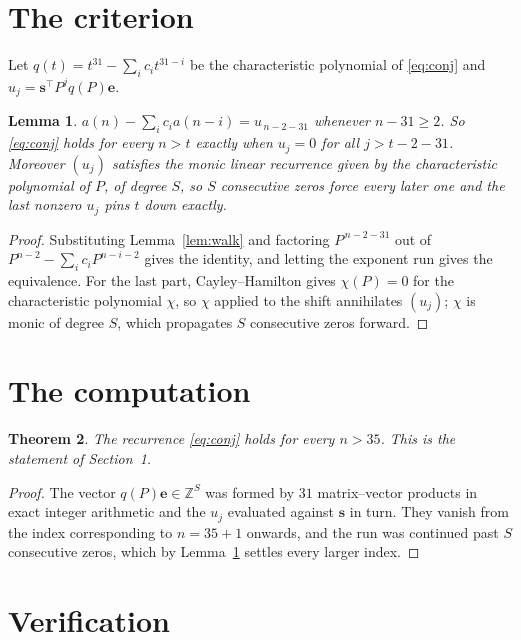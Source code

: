\documentclass[11pt,a4paper]{article}
\theoremstyle{plain}
\newtheorem{theorem}{Theorem}
\newtheorem{lemma}[theorem]{Lemma}
\theoremstyle{definition}
\begin{document}
\section{The criterion}

Let $q(t)=t^{31}-\sum_i c_i t^{31-i}$ be the characteristic polynomial of
\eqref{eq:conj} and $u_j=\mathbf{s}^{\!\top}P^{j}q(P)\mathbf{e}$.

\begin{lemma}\label{lem:crit}
$a(n)-\sum_i c_i a(n-i)=u_{\,n-2-31}$ whenever $n-31\ge2$. So \eqref{eq:conj}
holds for every $n>t$ exactly when $u_j=0$ for all $j>t-2-31$. Moreover $(u_j)$
satisfies the monic linear recurrence given by the characteristic polynomial of $P$, of
degree $S$, so $S$ consecutive zeros force every later one and the last nonzero $u_j$ pins
$t$ down exactly.
\end{lemma}

\begin{proof}
Substituting Lemma~\ref{lem:walk} and factoring $P^{\,n-2-31}$ out of
$P^{n-2}-\sum_i c_i P^{n-i-2}$ gives the identity, and letting the exponent run gives the
equivalence. For the last part, Cayley--Hamilton gives $\chi(P)=0$ for the characteristic
polynomial $\chi$, so $\chi$ applied to the shift annihilates $(u_j)$; $\chi$ is monic of
degree $S$, which propagates $S$ consecutive zeros forward.
\end{proof}

\section{The computation}

\begin{theorem}
The recurrence \eqref{eq:conj} holds for every $n>35$. This is the statement of
Section~1.
\end{theorem}

\begin{proof}
The vector $q(P)\mathbf{e}\in\mathbb{Z}^{S}$ was formed by $31$ matrix--vector
products in exact integer arithmetic and the $u_j$ evaluated against $\mathbf{s}$ in turn.
They vanish from the index corresponding to $n=35+1$ onwards, and the run was continued
past $S$ consecutive zeros, which by Lemma~\ref{lem:crit} settles every larger index.
\end{proof}

\section{Verification}
\end{document}
